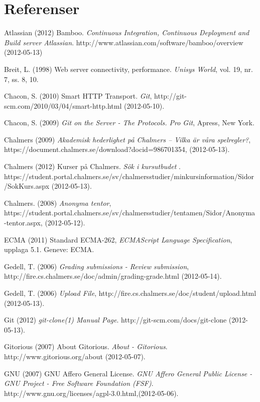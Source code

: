 
\renewcommand{\thechapter}{}
\chapter{Referenser}
\begin{flushleft}
\small

Atlassian (2012) Bamboo. \emph{Continuous Integration, Continuous Deployment and Build server Atlassian}. http://www.atlassian.com/software/bamboo/overview (2012-05-13)

Breit, L. (1998) Web server connectivity, performance. \emph{Unisys World}, vol. 19, nr. 7, ss. 8, 10.

Chacon, S. (2010) Smart HTTP Transport. \emph{Git}, http://git-scm.com/2010/03/04/smart-http.html (2012-05-10).

Chacon, S. (2009) \emph{Git on the Server - The Protocols. Pro Git}, Apress, New York.

Chalmers (2009) \emph{Akademisk hederlighet på Chalmers – Vilka är våra spelregler?}, https://document.chalmers.se/download?docid=986701354, (2012-05-13).

Chalmers (2012) Kurser på Chalmers. \emph{Sök i kursutbudet} . https://student.portal.chalmers.se/sv/chalmersstudier/minkursinformation/Sidor/SokKurs.aspx (2012-05-13).

Chalmers. (2008) \emph{Anonyma tentor}, https://student.portal.chalmers.se/sv/chalmersstudier/tentamen/Sidor/Anonyma-tentor.aspx, (2012-05-12).

ECMA (2011) Standard ECMA-262, \emph{ECMAScript Language Specification}, upplaga 5.1. Geneve: ECMA.

Gedell, T. (2006) \emph{Grading submissions - Review submission}, http://fire.cs.chalmers.se/doc/admin/grading-grade.html (2012-05-14).

Gedell, T. (2006) \emph{Upload File}, http://fire.cs.chalmers.se/doc/student/upload.html (2012-05-13).

Git (2012) \emph{git-clone(1) Manual Page}. http://git-scm.com/docs/git-clone (2012-05-13).

Gitorious (2007) About Gitorious. \emph{ About - Gitorious}. http://www.gitorious.org/about (2012-05-07).

GNU (2007) GNU Affero General License. \emph{GNU Affero General Public License - GNU Project - Free Software Foundation (FSF)}. http://www.gnu.org/licenses/agpl-3.0.html,(2012-05-06).


\end{flushleft}
